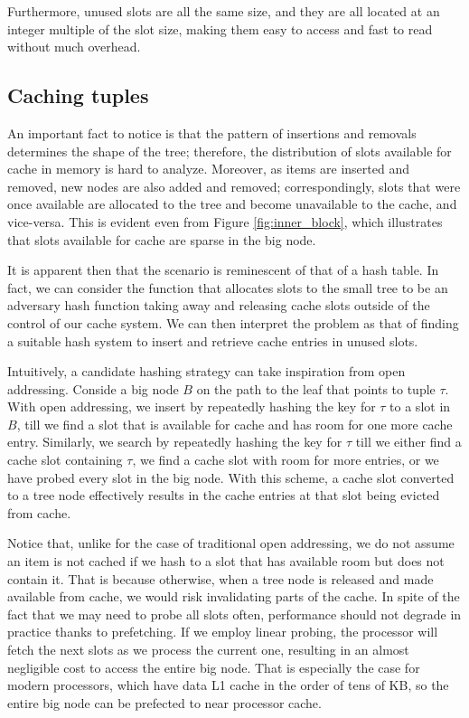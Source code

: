 \documentclass{article}
\begin{document}
Furthermore, unused slots are all the same size, and they are all located at an integer multiple
of the slot size, making them easy to access and fast to read without much overhead.


\subsection{Caching tuples}
An important fact to notice is that the pattern of insertions and removals determines the shape of the tree;
therefore, the distribution of slots available for cache in memory is hard to analyze.
Moreover, as items are inserted and removed, new nodes are also added and removed;
correspondingly, slots that were once available are allocated to the
tree and become unavailable to the cache, and vice-versa.
This is evident even from Figure \ref{fig:inner_block}, which illustrates that
slots available for cache are sparse in the big node.

It is apparent then that the scenario is reminescent of that of a hash table.
In fact, we can consider the function that allocates slots to the small tree to be an adversary
hash function taking away and releasing cache slots outside of the control of our cache system.
We can then interpret the problem as that of finding a suitable hash system to insert and retrieve
cache entries in unused slots.

Intuitively, a candidate hashing strategy can take inspiration from open addressing.
Conside a big node $B$ on the path to the leaf that points to tuple $\tau$.
With open addressing, we insert by repeatedly hashing the key for $\tau$ to a slot in $B$,
till we find a slot that is available for cache and has room for one more cache entry.
Similarly, we search by repeatedly hashing the key for $\tau$ till we either find
a cache slot containing $\tau$, we find a cache slot with room for more entries,
or we have probed every slot in the big node.
With this scheme, a cache slot converted to a tree node effectively results
in the cache entries at that slot being evicted from cache.

Notice that, unlike for the case of traditional open addressing, we do not assume an item is not cached
if we hash to a slot that has available room but does not contain it.
That is because otherwise, when a tree node is released and made available from cache, we would risk
invalidating parts of the cache.
In spite of the fact that we may need to probe all slots often, performance should not degrade in practice
thanks to prefetching.
If we employ linear probing, the processor will fetch the next slots as we process the current one,
resulting in an almost negligible cost to access the entire big node.
That is especially the case for modern processors, which have data L1 cache in the order of tens of KB,
so the entire big node can be prefected to near processor cache.
\end{document}
